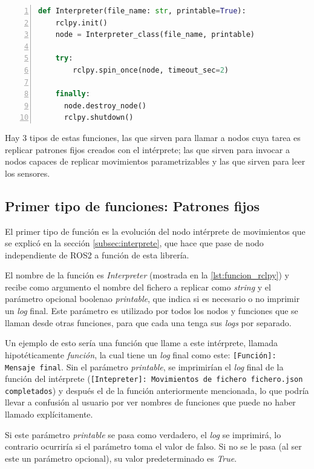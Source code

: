 \begin{lstlisting}[language=Python, caption={Ejemplo de función que invoca un nodo ROS2}, label={lst:funcion_rclpy}, numbers=left, backgroundcolor=\color{gray!10}]    
def Interpreter(file_name: str, printable=True):
    rclpy.init()
    node = Interpreter_class(file_name, printable)
    
    try:
        rclpy.spin_once(node, timeout_sec=2)
    
    finally:
      node.destroy_node()
      rclpy.shutdown()
\end{lstlisting}

Hay 3 tipos de estas funciones, las que sirven para llamar a nodos cuya tarea es replicar patrones fijos creados con el intérprete; las que sirven para invocar a nodos capaces de replicar movimientos parametrizables y las que sirven para leer los sensores.

\subsection{Primer tipo de funciones: Patrones fijos}

El primer tipo de función es la evolución del nodo intérprete de movimientos que se explicó en la sección \ref{subsec:interprete}, que hace que pase de nodo independiente de ROS2 a función de esta librería.

El nombre de la función es \textit{Interpreter} (mostrada en la \autoref{lst:funcion_rclpy}) y recibe como argumento el nombre del fichero a replicar como \textit{string} y el parámetro opcional boolenao \textit{printable}, que indica si es necesario o no imprimir un \textit{log} final. Este parámetro es utilizado por todos los nodos y funciones que se llaman desde otras funciones, para que cada una tenga sus \textit{logs} por separado. 

Un ejemplo de esto sería una función que llame a este intérprete, llamada hipotéticamente \textit{función}, la cual tiene un \textit{log} final como este: \texttt{[Función]: Mensaje final}. Sin el parámetro \textit{printable}, se imprimirían el \textit{log} final de la función del intérprete (\texttt{[Intepreter]: Movimientos de fichero fichero.json completados}) y después el de la función anteriormente mencionada, lo que podría llevar a confusión al usuario por ver nombres de funciones que puede no haber llamado explícitamente.

Si este parámetro \textit{printable} se pasa como  verdadero, el \textit{log} se imprimirá, lo contrario ocurriría si el parámetro toma el valor de falso. Si no se le pasa (al ser este un parámetro opcional), su valor predeterminado es \textit{True}.

